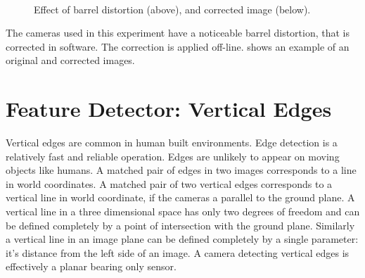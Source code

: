 \begin{figure}[htbp]
  \centering
{}\\

  \caption[Barrel distortion]{Effect of barrel distortion (above), and corrected image (below).}
  \label{fig:barrel_distortion}
\end{figure}

The cameras used in this experiment have a noticeable barrel
distortion, that is corrected in software. The correction is applied
off-line.  shows an example of an
original and corrected images.


\section{Feature Detector: Vertical Edges}

Vertical edges are common in human built environments. Edge detection
is a relatively fast and reliable operation. Edges are unlikely to
appear on moving objects like humans. A matched pair of edges in two
images corresponds to a line in world coordinates. A matched pair
of two vertical edges corresponds to a vertical line in world
coordinate, if the cameras a parallel to the ground plane. A vertical
line in a three dimensional space has only two degrees of freedom and
can be defined completely by a point of intersection with the ground
plane. Similarly a vertical line in an image plane can be defined
completely by a single parameter: it's distance from the left side of
an image. A camera detecting vertical edges is effectively a planar
bearing only sensor. 

